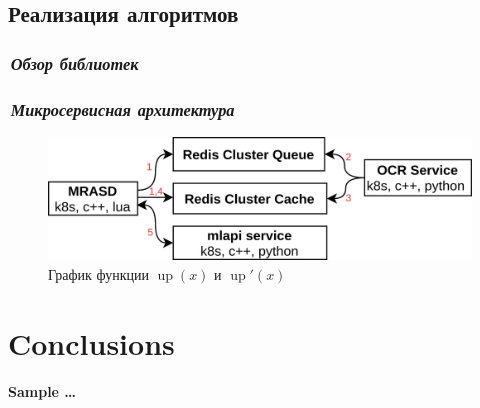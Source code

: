 \documentclass[12pt]{article}
\DeclareMathOperator{\up}{up}
\begin{document}
\subsection*{Реализация алгоритмов}

\subsubsection*{\it\,Обзор библиотек}

\subsubsection*{\it\,Микросервисная архитектура}
\begin{figure}[h!]
	\center
	\includegraphics[scale=0.25]{deploy.jpg}
	\caption{График функции $\up(x)$ и $\up'(x)$}
	\label{fig:02}
\end{figure}

\section{Conclusions}

\begin{thebibliography}{99}
 {\bf\color{ao} Sample \ldots}
\end{thebibliography}
\end{document}

